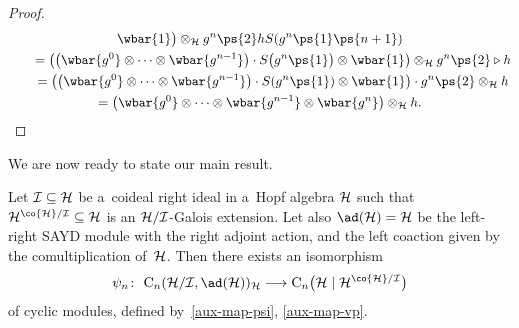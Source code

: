 \begin{proof}
\begin{gather*}
\wbar{1}\big)\otimes_{\cal H} g^n\ps{2}hS(g^n\ps{1}\ps{n+1})
\\
\qquad
=\big(\big(\wbar{g^0} \otimes\cdots\otimes \wbar{g^{n-1}}\big)\cdot S\big(g^n\ps{1}\big)\otimes \wbar{1}\big)\otimes_{\cal H}
g^n\ps{2} \triangleright h
\\
\qquad
=\big(\big(\wbar{g^0} \otimes\cdots\otimes \wbar{g^{n-1}}\big)\cdot S(g^n\ps{1})\otimes \wbar{1}\big)\cdot g^n\ps{2}
\otimes_{\cal H} h
\\
\qquad
=\big(\wbar{g^0} \otimes\cdots\otimes \wbar{g^{n-1}}\otimes \wbar{g^n}\big) \otimes_{\cal H} h. \tag*{\qed}
\end{gather*}
\renewcommand{\qed}{}
\end{proof}

We are now ready to state our main result.
\begin{Theorem}
\label{dirpict}
Let ${\cal I}\subseteq {\cal H}$ be a~coideal right ideal in a~Hopf algebra ${\cal H}$
such that ${\cal H}^{\co{\cal H}/{\cal I}}\subseteq {\cal H}$ is an ${\cal H}/{\cal I}$-Galois extension.
Let also $\ad({\cal H})={\cal H}$ be the left-right SAYD module with the right adjoint action, and the left
coaction given by the comultiplication of~${\cal H}$.
Then there exists an isomorphism
\begin{gather*}
\psi_{n}\colon \  {\rm C}_{n}({\cal H}/{\cal I},\ad({\cal H}))_{{\cal H}}\longrightarrow {\rm C}_{n}\big({\cal H}\mid{\cal H}^{\co{\cal H}/{\cal I}}\big)
\end{gather*}
of cyclic modules, defined by~\eqref{aux-map-psi}, \eqref{aux-map-vp}.
\end{Theorem}
